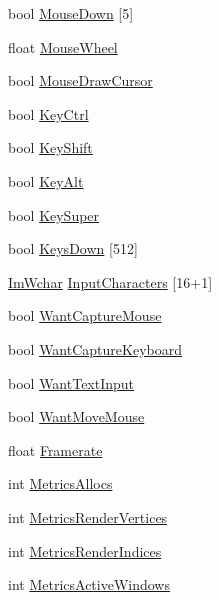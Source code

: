 \begin{DoxyCompactItemize}
\item 
bool \mbox{\hyperlink{struct_im_gui_i_o_a8f4613baafc93026175d9cdaf4e82d21}{Mouse\+Down}} \mbox{[}5\mbox{]}
\item 
float \mbox{\hyperlink{struct_im_gui_i_o_a21d3ca4928989a2c838b7b4ea95e5824}{Mouse\+Wheel}}
\item 
bool \mbox{\hyperlink{struct_im_gui_i_o_a9b240460966bf2bd35c30f27b8db4028}{Mouse\+Draw\+Cursor}}
\item 
bool \mbox{\hyperlink{struct_im_gui_i_o_a51de8f65dcabb80ef4e0d3c759ffcd7f}{Key\+Ctrl}}
\item 
bool \mbox{\hyperlink{struct_im_gui_i_o_a3c7642214f88862af5b8467f98ac35c9}{Key\+Shift}}
\item 
bool \mbox{\hyperlink{struct_im_gui_i_o_a1e64ef08a4448a2cac874496130992cb}{Key\+Alt}}
\item 
bool \mbox{\hyperlink{struct_im_gui_i_o_afda9e11e21b7ba21573671c38d9f4a81}{Key\+Super}}
\item 
bool \mbox{\hyperlink{struct_im_gui_i_o_a182f42d74cb25a4cf611cc0f776b3848}{Keys\+Down}} \mbox{[}512\mbox{]}
\item 
\mbox{\hyperlink{imgui_8h_af2c7badaf05a0008e15ef76d40875e97}{Im\+Wchar}} \mbox{\hyperlink{struct_im_gui_i_o_af6283418a2bff9db1522a6245476c7ed}{Input\+Characters}} \mbox{[}16+1\mbox{]}
\item 
bool \mbox{\hyperlink{struct_im_gui_i_o_af5b8add76c5d833a65df19b5456acd7e}{Want\+Capture\+Mouse}}
\item 
bool \mbox{\hyperlink{struct_im_gui_i_o_a458e4ca98d896adb16e3a41ec6d2b811}{Want\+Capture\+Keyboard}}
\item 
bool \mbox{\hyperlink{struct_im_gui_i_o_a0e53197e96187a57b2d86720bf163f4d}{Want\+Text\+Input}}
\item 
bool \mbox{\hyperlink{struct_im_gui_i_o_a0bd366ca18e78bf58f674a355189eaf3}{Want\+Move\+Mouse}}
\item 
float \mbox{\hyperlink{struct_im_gui_i_o_a8c6c2be54ddeda3cfb4a73cf95701a54}{Framerate}}
\item 
int \mbox{\hyperlink{struct_im_gui_i_o_a9d17ce57fff7919f3ca1584c2186daaf}{Metrics\+Allocs}}
\item 
int \mbox{\hyperlink{struct_im_gui_i_o_a8ec9d203f4543047a8820366c5734529}{Metrics\+Render\+Vertices}}
\item 
int \mbox{\hyperlink{struct_im_gui_i_o_a19daed6a7fa22819fe187dfc2a2f5683}{Metrics\+Render\+Indices}}
\item 
int \mbox{\hyperlink{struct_im_gui_i_o_ae47a71018cc9b0c7b55912a4bfa9149c}{Metrics\+Active\+Windows}}

\end{DoxyCompactItemize}
